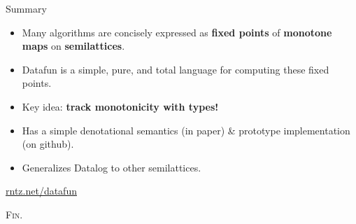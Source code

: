 \documentclass{beamer}
\begin{document}




\begin{frame}{Summary}\large

  \begin{itemize}
  \item Many algorithms are concisely expressed as \textbf{fixed points} of
    \textbf{monotone maps} on \textbf{semilattices}.
  \item Datafun is a simple, pure, and total language for computing these fixed
    points.
  \item Key idea: \textbf{track monotonicity with types!}
  \item Has a simple denotational semantics (in paper) \& prototype
    implementation (on github).
  \item Generalizes Datalog to other semilattices.
  \end{itemize}

  \begin{center}
    \huge \url{rntz.net/datafun}
  \end{center}
\end{frame}


\begin{frame}
  \centering \Huge \textsc{Fin.}
\end{frame}
\end{document}
